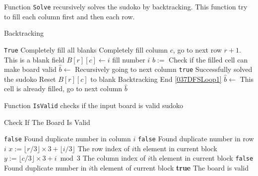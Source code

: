 Function \texttt{Solve} recursively solves the sudoko by backtracking. This function try to fill each column first and then each row.
\begin{algorithm}[H]
\caption{Backtracking}
\begin{algorithmic}[1]
\State \Return \texttt{True} \Comment Completely fill all blanks
\EndIf
{}
\State {} \Comment Completely fill column $c$, go to next row $r+1$.
\EndIf
{} \Comment This is a blank field
 \label{037DFSLoop1}
\State $B[r][c] \gets i$ \Comment fill number $i$
\State $b:=$ \Comment Check if the filled cell can make board valid
\State $\hat{b}\gets$ \Comment Recursively going to next column
\State \Return \texttt{true} \Comment Successfully solved the sudoko
\EndIf
\EndIf
\State Reset $B[r][c]$ to blank \Comment Backtracking
\EndFor \Comment End \ref{037DFSLoop1}
\Else
\State $\hat{b}\gets$ \Comment This cell is already filled, go to next column
\State \Return $\hat{b}$
\EndIf
\EndFunction
\end{algorithmic}
\end{algorithm}

Function \texttt{IsValid} checks if the input board is valid sudoko 
\begin{algorithm}[H]
\caption{Check If The Board Is Valid}
\begin{algorithmic}[1]
\State \Return \texttt{false} \Comment Found duplicate number in column $i$
\EndIf
{}
\State \Return \texttt{false} \Comment Found duplicate number in row $i$
\EndIf
\State $x:=\lfloor r/3\rfloor \times 3 + \lfloor i/3\rfloor$ \Comment The row index of $i$th element in current block
\State $y:=\lfloor c/3\rfloor \times 3 + i\bmod 3$ \Comment The column index of $i$th element in current block
\State \Return \texttt{false} \Comment Found duplicate number in $i$th element of current block
\EndIf
\EndIf
\EndFor
\State \Return \textbf{true} \Comment The board is valid
\EndFunction
\end{algorithmic}
\end{algorithm}

